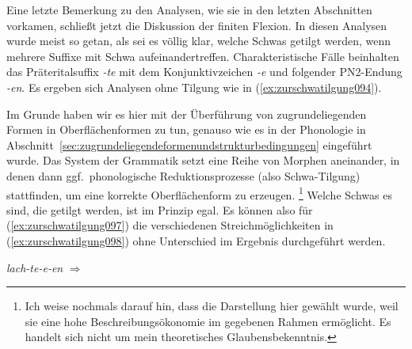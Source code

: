 
Eine letzte Bemerkung zu den Analysen, wie sie in den letzten Abschnitten vorkamen, schließt jetzt die Diskussion der finiten Flexion.
In diesen Analysen wurde meist so getan, als sei es völlig klar, welche Schwas getilgt werden, wenn mehrere Suffixe mit Schwa aufeinandertreffen.
Charakteristische Fälle beinhalten das Präteritalsuffix \textit{-te} mit dem Konjunktivzeichen \textit{-e} und folgender PN2-Endung \textit{-en}.
Es ergeben sich Analysen ohne Tilgung wie in (\ref{ex:zurschwatilgung094}).

\begin{exe}
  \ex\label{ex:zurschwatilgung094}
  \begin{xlist}
  \end{xlist}
\end{exe}

Im Grunde haben wir es hier mit der Überführung von zugrundeliegenden Formen in Oberflächenformen zu tun, genauso wie es in der Phonologie in Abschnitt~\ref{sec:zugrundeliegendeformenundstrukturbedingungen} eingeführt wurde.
Das System der Grammatik setzt eine Reihe von Morphen aneinander, in denen dann ggf.\ phonologische Reduktionsprozesse (also Schwa-Tilgung) stattfinden, um eine korrekte Oberflächenform zu erzeugen.%
\footnote{Ich weise nochmals darauf hin, dass die Darstellung hier gewählt wurde, weil sie eine hohe Beschreibungsökonomie im gegebenen Rahmen ermöglicht.
Es handelt sich nicht um mein theoretisches Glaubensbekenntnis.}
Welche Schwas es sind, die getilgt werden, ist im Prinzip egal.
Es können also für (\ref{ex:zurschwatilgung097}) die verschiedenen Streichmöglichkeiten in (\ref{ex:zurschwatilgung098}) ohne Unterschied im Ergebnis durchgeführt werden.

\begin{exe}
  \ex\label{ex:zurschwatilgung098} \textit{lach-te-e-en} $\Rightarrow$
  \begin{xlist}
  \end{xlist}
\end{exe}

